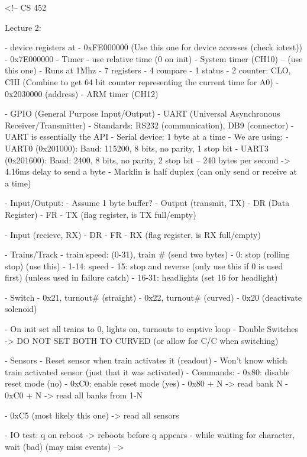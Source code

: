 <!-- CS 452


Lecture 2:


- device registers at 
   - 0xFE000000  (Use this one for device accesses (check iotest))
   - 0x7E000000
- Timer
   - use relative time (0 on init)
   - System timer (CH10) -- (use this one)
      - Runs at 1Mhz
      - 7 registers
         - 4 compare
         - 1 status
         - 2 counter: CLO, CHI (Combine to get 64 bit counter representing the current time for A0)
      - 0x2030000 (address)
   - ARM timer (CH12)

- GPIO (General Purpose Input/Output)
- UART (Universal Asynchronous Receiver/Transmitter)
   - Standards: RS232 (communication), DB9 (connector)
   - UART is essentially the API
   - Serial device: 1 byte at a time
   - We are using: 
      - UART0 (0x201000): Baud: 115200, 8 bits, no parity, 1 stop bit
      - UART3 (0x201600): Baud: 2400,   8 bits, no parity, 2 stop bit -- 240 bytes per second -> 4.16ms delay to send a byte
      - Marklin is half duplex (can only send or receive at a time)

- Input/Output:
   - Assume 1 byte buffer?
   - Output (transmit, TX)
      - DR (Data Register)
      - FR - TX  (flag register, is TX full/empty)

   - Input (recieve, RX)
      - DR
      - FR - RX (flag register, is RX full/empty)

- Trains/Track
      - train speed: (0-31), train # (send two bytes)
         - 0: stop (rolling stop) (use this) 
         - 1-14: speed
         - 15: stop and reverse (only use this if 0 is used first) (unless used in failure catch)
         - 16-31: headlights (set 16 for headlight)

- Switch
   - 0x21, turnout# (straight)
   - 0x22, turnout# (curved)
   - 0x20 (deactivate solenoid)

   - On init set all trains to 0, lights on, turnouts to captive loop
   - Double Switches -> DO NOT SET BOTH TO CURVED (or allow for C/C when switching)

- Sensors
   - Reset sensor when train activates it (readout)
   - Won't know which train activated sensor (just that it was activated) 
   - Commands:
      - 0x80: disable reset mode (no)
      - 0xC0: enable reset mode (yes)
      - 0x80 + N -> read bank N
      - 0xC0 + N -> read all banks from 1-N

      - 0xC5 (most likely this one) -> read all sensors


- IO test: q on reboot -> reboots before q appears
- while waiting for character, wait (bad) (may miss events)
-->   